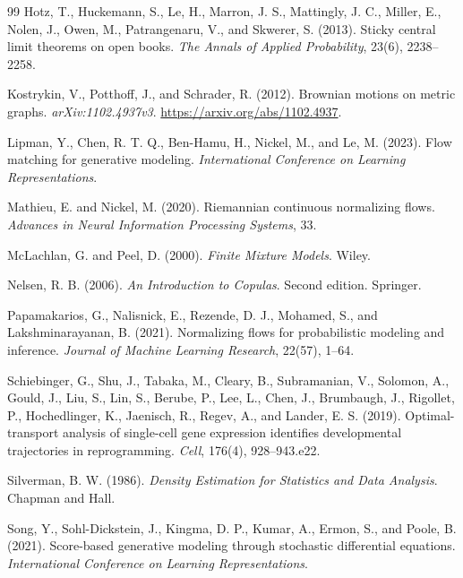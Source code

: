 \begin{thebibliography}{99}
Hotz, T., Huckemann, S., Le, H., Marron, J. S., Mattingly, J. C.,
Miller, E., Nolen, J., Owen, M., Patrangenaru, V., and Skwerer, S. (2013).
Sticky central limit theorems on open books.
\emph{The Annals of Applied Probability}, 23(6), 2238--2258.

Kostrykin, V., Potthoff, J., and Schrader, R. (2012).
Brownian motions on metric graphs.
\emph{arXiv:1102.4937v3}.
\url{https://arxiv.org/abs/1102.4937}.

Lipman, Y., Chen, R. T. Q., Ben-Hamu, H., Nickel, M., and Le, M. (2023).
Flow matching for generative modeling.
\emph{International Conference on Learning Representations}.

Mathieu, E. and Nickel, M. (2020).
Riemannian continuous normalizing flows.
\emph{Advances in Neural Information Processing Systems}, 33.

McLachlan, G. and Peel, D. (2000).
\emph{Finite Mixture Models}.
Wiley.

Nelsen, R. B. (2006).
\emph{An Introduction to Copulas}.
Second edition. Springer.

Papamakarios, G., Nalisnick, E., Rezende, D. J., Mohamed, S., and
Lakshminarayanan, B. (2021).
Normalizing flows for probabilistic modeling and inference.
\emph{Journal of Machine Learning Research}, 22(57), 1--64.

Schiebinger, G., Shu, J., Tabaka, M., Cleary, B., Subramanian, V.,
Solomon, A., Gould, J., Liu, S., Lin, S., Berube, P., Lee, L., Chen, J.,
Brumbaugh, J., Rigollet, P., Hochedlinger, K., Jaenisch, R., Regev, A., and
Lander, E. S. (2019).
Optimal-transport analysis of single-cell gene expression identifies
developmental trajectories in reprogramming.
\emph{Cell}, 176(4), 928--943.e22.

Silverman, B. W. (1986).
\emph{Density Estimation for Statistics and Data Analysis}.
Chapman and Hall.

Song, Y., Sohl-Dickstein, J., Kingma, D. P., Kumar, A., Ermon, S., and
Poole, B. (2021).
Score-based generative modeling through stochastic differential equations.
\emph{International Conference on Learning Representations}.


\end{thebibliography}
